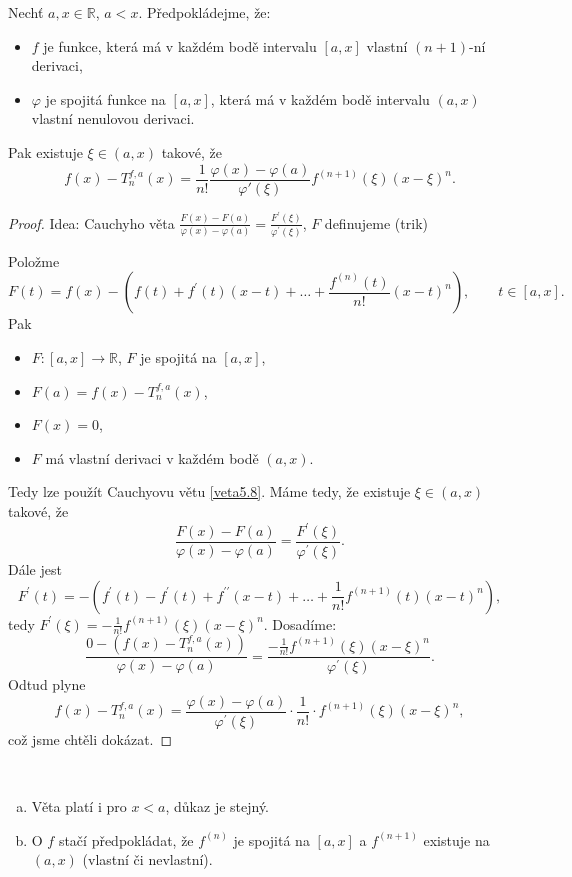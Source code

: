 \begin{veta}\label{veta6.3}
Nechť $a,x \in \mathbb{R}$, $a < x$. Předpokládejme, že:
\begin{itemize}
\item $f$ je funkce, která má v každém bodě intervalu $[a,x]$ vlastní $(n+1)$-ní derivaci,
\item $\varphi$ je spojitá funkce na $[a,x]$, která má v každém bodě intervalu $(a,x)$ vlastní nenulovou derivaci.
\end{itemize}
Pak existuje $\xi \in (a,x)$ takové, že
\[
f(x) - T^{f,a}_n(x)
=
\frac{1}{n!}
\frac{\varphi(x)-\varphi(a)}{\varphi'(\xi)}
f^{(n+1)}(\xi)(x-\xi)^n.
\]
\end{veta}

\begin{proof}
	Idea: Cauchyho věta $\frac{F(x)-F(a)}{\varphi(x)-\varphi(a)}=\frac{F^\prime(\xi)}{\varphi^\prime(\xi)}$, $F$ definujeme (trik)
	\par Položme
	$$F(t)=f(x)-\left (f(t)+f^\prime(t)(x-t)+\dots +\frac{f^{(n)}(t)}{n!}(x-t)^n\right),\qquad t\in \left [ a,x \right ]. $$
	Pak \begin{itemize}
		\item $F: \left [ a,x \right ] \to \mathbb R $, $F$ je spojitá na $\left [ a,x \right ] $,
		\item $F(a)=f(x)-T_n^{f,a}(x)$,
		\item $F(x)=0$,
		\item $F$ má vlastní derivaci v každém bodě $(a,x)$.
\end{itemize}
Tedy lze použít Cauchyovu větu \ref{veta5.8}. Máme tedy, že existuje $\xi \in (a,x)$ takové, že
$$
\frac{F(x)-F(a)}{\varphi(x)-\varphi(a)}= \frac{F^\prime(\xi)}{\varphi^\prime(\xi)}.
$$
Dále jest
$$
    F^\prime(t)=- \left( f^\prime(t) -f^\prime(t) + f^{\prime\prime}(x-t)+ \dots + \frac{1}{n!}f^{(n+1)}(t)(x-t)^n \right ),
$$
tedy $F^\prime(\xi) = - \frac{1}{n!}f^{(n+1)}(\xi)(x-\xi)^n$. Dosadíme:
$$
\frac{0-(f(x)-T_n^{f,a}(x))}{\varphi(x)-\varphi(a)}=\frac{-\frac{1}{n!}f^{(n+1)}(\xi)(x-\xi)^n}{\varphi^\prime(\xi)}.
$$
Odtud plyne
$$
    f(x)-T_n^{f,a}(x) = \frac{\varphi(x)-\varphi(a)}{\varphi^\prime(\xi)}\cdot \frac{1}{n!}\cdot f^{(n+1)}(\xi)(x-\xi)^n,
$$
což jsme chtěli dokázat.
\end{proof}

\begin{poznamka}\,
\begin{enumerate}[(a)]
	\item Věta platí i pro $x<a$, důkaz je stejný.
	\item O $f$ stačí předpokládat, že $f^{(n)}$ je spojitá na $\left [ a,x \right ] $ a $f^{(n+1)}$ existuje
	na $(a,x)$ (vlastní či nevlastní).
\end{enumerate}
\end{poznamka}

